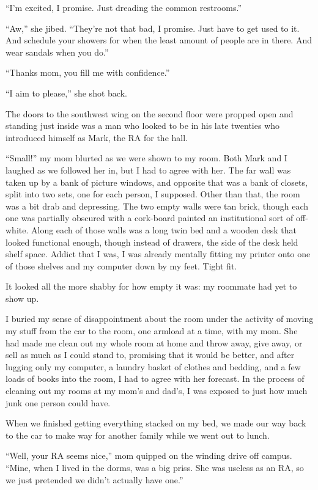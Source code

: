 ``I'm excited, I promise.  Just dreading the common restrooms.''

``Aw,'' she jibed.  ``They're not that bad, I promise.  Just have to get used to it.  And schedule your showers for when the least amount of people are in there.  And wear sandals when you do.''

``Thanks mom, you fill me with confidence.''

``I aim to please,'' she shot back.

The doors to the southwest wing on the second floor were propped open and standing just inside was a man who looked to be in his late twenties who introduced himself as Mark, the RA for the hall.

``Small!'' my mom blurted as we were shown to my room.  Both Mark and I laughed as we followed her in, but I had to agree with her.  The far wall was taken up by a bank of picture windows, and opposite that was a bank of closets, split into two sets, one for each person, I supposed.  Other than that, the room was a bit drab and depressing.  The two empty walls were tan brick, though each one was partially obscured with a cork-board painted an institutional sort of off-white.  Along each of those walls was a long twin bed and a wooden desk that looked functional enough, though instead of drawers, the side of the desk held shelf space.  Addict that I was, I was already mentally fitting my printer onto one of those shelves and my computer down by my feet.  Tight fit.

It looked all the more shabby for how empty it was: my roommate had yet to show up.

I buried my sense of disappointment about the room under the activity of moving my stuff from the car to the room, one armload at a time, with my mom.  She had made me clean out my whole room at home and throw away, give away, or sell as much as I could stand to, promising that it would be better, and after lugging only my computer, a laundry basket of clothes and bedding, and a few loads of books into the room, I had to agree with her forecast.  In the process of cleaning out my rooms at my mom's and dad's, I was exposed to just how much junk one person could have.

When we finished getting everything stacked on my bed, we made our way back to the car to make way for another family while we went out to lunch.

``Well, your RA seems nice,'' mom quipped on the winding drive off campus.  ``Mine, when I lived in the dorms, was a big priss.  She was useless as an RA, so we just pretended we didn't actually have one.''

